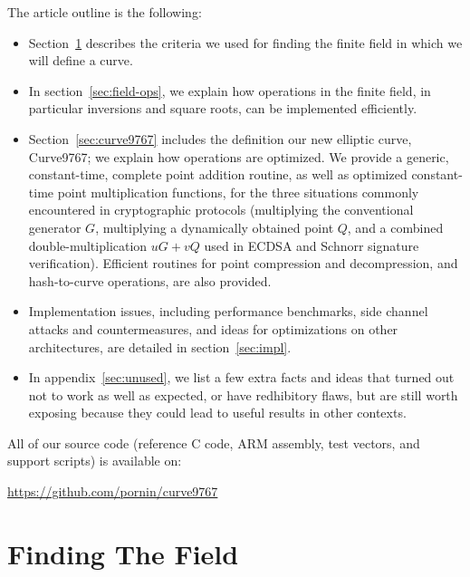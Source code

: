 \documentclass{llncs}
\begin{document}
The article outline is the following:
\begin{itemize}

    \item Section~\ref{sec:find-field} describes the criteria we used for
    finding the finite field in which we will define a curve.

    \item In section~\ref{sec:field-ops}, we explain how operations in the
    finite field, in particular inversions and square roots, can be
    implemented efficiently.

    \item Section~\ref{sec:curve9767} includes the definition our new
    elliptic curve, Curve9767; we explain how operations are optimized.
    We provide a generic, constant-time, complete point addition
    routine, as well as optimized constant-time point multiplication
    functions, for the three situations commonly encountered in
    cryptographic protocols (multiplying the conventional generator $G$,
    multiplying a dynamically obtained point $Q$, and a combined
    double-multiplication $uG + vQ$ used in ECDSA and Schnorr signature
    verification). Efficient routines for point compression and
    decompression, and hash-to-curve operations, are also provided.

    \item Implementation issues, including performance benchmarks,
    side channel attacks and countermeasures, and ideas for optimizations
    on other architectures, are detailed in section~\ref{sec:impl}.

    \item In appendix~\ref{sec:unused}, we list a few extra facts and
    ideas that turned out not to work as well as expected, or have
    redhibitory flaws, but are still worth exposing because they could
    lead to useful results in other contexts.

\end{itemize}

All of our source code (reference C code, ARM assembly, test vectors, and
support scripts) is available on:
\begin{center}
    \url{https://github.com/pornin/curve9767}
\end{center}

\section{Finding The Field}\label{sec:find-field}
\end{document}

